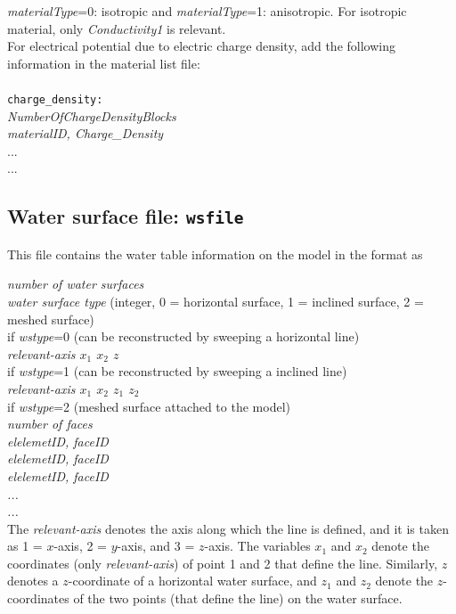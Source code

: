 \emph{materialType}=0: isotropic and \emph{materialType}=1: anisotropic. For isotropic material, only \emph{Conductivity1} is relevant.
\\
For electrical potential due to electric charge density, add the following information in the material list file:\\
\\
\texttt{charge\_density:}\\
\emph{NumberOfChargeDensityBlocks\\
materialID, Charge\_Density}\\
...\\
...\\

\subsection{Water surface file: \texttt{wsfile}}

This file contains the water table information on the model in the format as

\emph{number of water surfaces}\\
\emph{water surface type} (integer, 0 = horizontal surface, 1 = inclined surface, 2 = meshed surface)\\
if \emph{wstype}=0 (can be reconstructed by sweeping a horizontal line)\\
  \emph{relevant-axis $x_1$ $x_2$ $z$}\\
if \emph{wstype}=1 (can be reconstructed by sweeping a inclined line)\\
  \emph{relevant-axis $x_1$ $x_2$ $z_1$ $z_2$}\\
if \emph{wstype}=2 (meshed surface attached to the model)\\
  \emph{number of faces\\
  elelemetID, faceID\\
  elelemetID, faceID\\
  elelemetID, faceID\\
  ...\\
  ...}\\

The \emph{relevant-axis} denotes the axis along which the line is defined, and it is taken as 1 = $x$-axis, 2 = $y$-axis, and 3 = $z$-axis. The variables $x_1$ and $x_2$ denote the coordinates (only \emph{relevant-axis}) of point 1 and 2 that define the line. Similarly, $z$ denotes a $z$-coordinate of a horizontal water surface, and $z_1$ and $z_2$ denote the $z$-coordinates of the two points (that define the line) on the water surface.\\


